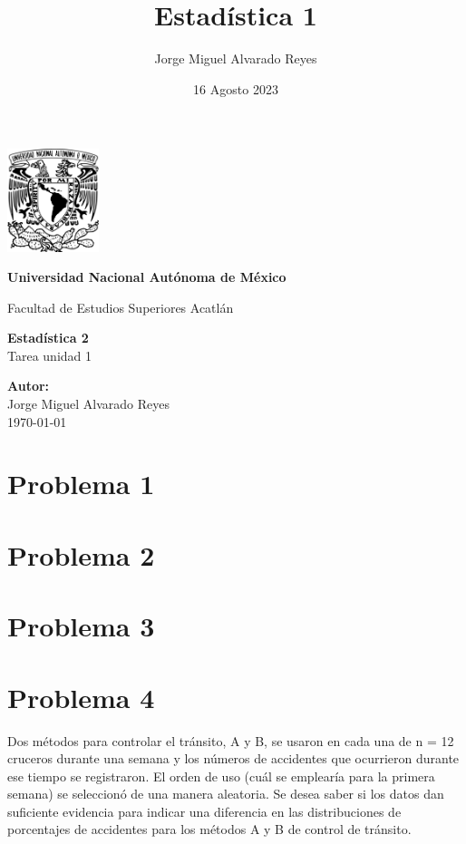 \documentclass{article}
\title{Estadística 1}
\author{Jorge Miguel Alvarado Reyes}
\date{16 Agosto 2023}
\begin{document}
\begin{titlepage}
    \begin{center}
        \includegraphics[width=0.2\textwidth]{../../unam.png}
        \vspace*{.5cm}

        \LARGE
        \textbf{Universidad Nacional Autónoma de México}

        \vspace{0.5cm}
        \LARGE
        Facultad de Estudios Superiores Acatlán

        \vspace{2cm}

        \textbf{Estadística 2} \\
        Tarea unidad 1

        \vfill

        \vspace{1cm}

        \textbf{\large Autor:} \\
        Jorge Miguel Alvarado Reyes \\
        \vspace{.5cm}
        \normalsize \today

    \end{center}
\end{titlepage}
\newpage

\tableofcontents

\newpage

\section{Problema 1}
\section{Problema 2}
\section{Problema 3}
\section{Problema 4}
Dos métodos para controlar el tránsito, A y B, se usaron en cada una de n = 12 cruceros durante una semana y los números de accidentes que ocurrieron durante ese tiempo se registraron. El orden de uso (cuál se emplearía para la primera semana) se seleccionó de una manera aleatoria. Se desea saber si los datos dan suficiente evidencia para indicar una diferencia en las distribuciones de porcentajes de accidentes para los métodos A y B de control de tránsito.
\end{document}
